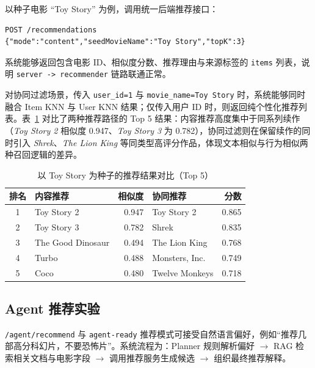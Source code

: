 以种子电影 ``Toy Story'' 为例，调用统一后端推荐接口：
\begin{verbatim}
POST /recommendations
{"mode":"content","seedMovieName":"Toy Story","topK":3}
\end{verbatim}
系统能够返回包含电影 ID、相似度分数、推荐理由与来源标签的 \texttt{items} 列表，说明 \texttt{server -> recommender} 链路联通正常。

对协同过滤场景，传入 \texttt{user\_id=1} 与 \texttt{movie\_name=Toy Story} 时，系统能够同时融合 Item KNN 与 User KNN 结果；仅传入用户 ID 时，则返回纯个性化推荐列表。表~\ref{tab:rec-compare} 对比了两种推荐路径的 Top 5 结果：内容推荐高度集中于同系列续作（\textit{Toy Story 2} 相似度 0.947、\textit{Toy Story 3} 为 0.782），协同过滤则在保留续作的同时引入 \textit{Shrek}、\textit{The Lion King} 等同类型高评分作品，体现文本相似与行为相似两种召回逻辑的差异。

\begin{table}[htbp]
    \centering
    \caption{以 Toy Story 为种子的推荐结果对比（Top 5）} \label{tab:rec-compare}
    \renewcommand{\arraystretch}{1.15}
    \setlength{\tabcolsep}{5pt}
    \small
    \begin{tabular}{|c|l|r|l|r|}
        \hline
        \textbf{排名} & \textbf{内容推荐} & \textbf{相似度} & \textbf{协同推荐} & \textbf{分数} \\
        \hline
        1 & Toy Story 2       & 0.947 & Toy Story 2      & 0.865 \\
        \hline
        2 & Toy Story 3       & 0.782 & Shrek            & 0.835 \\
        \hline
        3 & The Good Dinosaur & 0.494 & The Lion King    & 0.768 \\
        \hline
        4 & Turbo             & 0.488 & Monsters, Inc.   & 0.749 \\
        \hline
        5 & Coco              & 0.480 & Twelve Monkeys   & 0.718 \\
        \hline
    \end{tabular}
\end{table}

\subsection{Agent 推荐实验}

\texttt{/agent/recommend} 与 \texttt{agent-ready} 推荐模式可接受自然语言偏好，例如“推荐几部高分科幻片，不要恐怖片”。系统流程为：Planner 规则解析偏好 $\rightarrow$ RAG 检索相关文档与电影字段 $\rightarrow$ 调用推荐服务生成候选 $\rightarrow$ 组织最终推荐解释。

